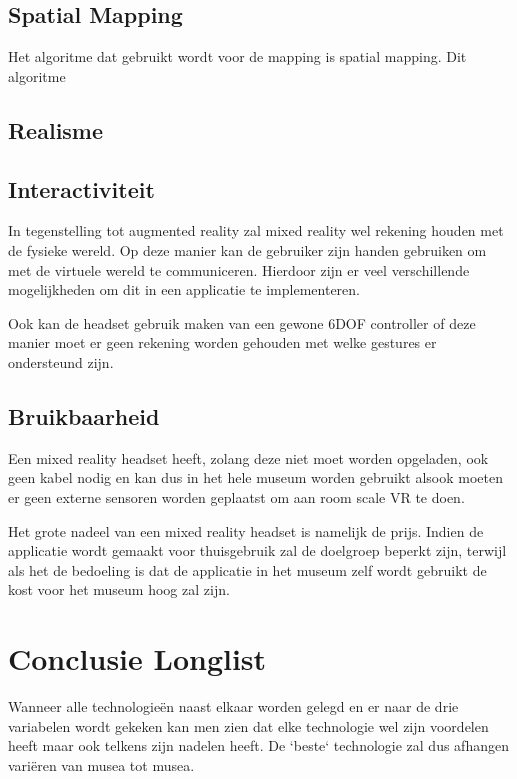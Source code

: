 
\subsection{Spatial Mapping}
Het algoritme dat gebruikt wordt voor de mapping is spatial mapping. Dit algoritme %

\subsection{Realisme}


\subsection{Interactiviteit}
In tegenstelling tot augmented reality zal mixed reality wel rekening houden met de fysieke wereld. Op deze manier kan de gebruiker zijn handen gebruiken om met de virtuele wereld te communiceren. Hierdoor zijn er veel verschillende mogelijkheden om dit in een applicatie te implementeren.

Ook kan de headset gebruik maken van een gewone 6DOF controller of deze manier moet er geen rekening worden gehouden met welke gestures er ondersteund zijn.

\subsection{Bruikbaarheid}
Een mixed reality headset heeft, zolang deze niet moet worden opgeladen, ook geen kabel nodig en kan dus in het hele museum worden gebruikt alsook moeten er geen externe sensoren worden geplaatst om aan room scale VR te doen. 

Het grote nadeel van een mixed reality headset is namelijk de prijs. Indien de applicatie wordt gemaakt voor thuisgebruik zal de doelgroep beperkt zijn, terwijl als het de bedoeling is dat de applicatie in het museum zelf wordt gebruikt de kost voor het museum hoog zal zijn.


\section{Conclusie Longlist}
Wanneer alle technologieën naast elkaar worden gelegd en er naar de drie variabelen wordt gekeken kan men zien dat elke technologie wel zijn voordelen heeft maar ook telkens zijn nadelen heeft. De `beste` technologie zal dus afhangen variëren van musea tot musea. 

